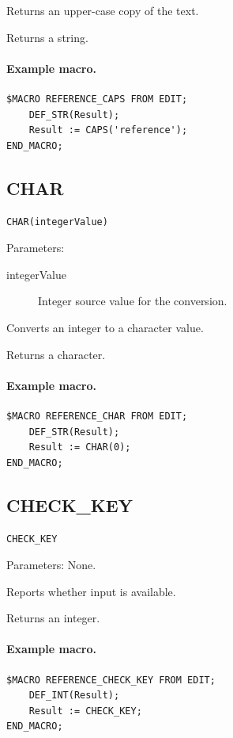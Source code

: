 \documentclass[a4paper,10pt,twoside,openany]{book}
\begin{document}
Returns an upper-case copy of the text.

Returns a string.

\paragraph{Example macro.}
\begin{verbatim}
$MACRO REFERENCE_CAPS FROM EDIT;
    DEF_STR(Result);
    Result := CAPS('reference');
END_MACRO;
\end{verbatim}

\label{prim:intrinsic-char}
\subsection*{CHAR}
\begin{verbatim}
CHAR(integerValue)
\end{verbatim}
Parameters:
\begin{description}
\item[integerValue] Integer source value for the conversion.
\end{description}

Converts an integer to a character value.

Returns a character.

\paragraph{Example macro.}
\begin{verbatim}
$MACRO REFERENCE_CHAR FROM EDIT;
    DEF_STR(Result);
    Result := CHAR(0);
END_MACRO;
\end{verbatim}

\label{prim:intrinsic-check-key}
\subsection*{CHECK\_KEY}
\begin{verbatim}
CHECK_KEY
\end{verbatim}
Parameters: None.

Reports whether input is available.

Returns an integer.

\paragraph{Example macro.}
\begin{verbatim}
$MACRO REFERENCE_CHECK_KEY FROM EDIT;
    DEF_INT(Result);
    Result := CHECK_KEY;
END_MACRO;
\end{verbatim}
\end{document}
